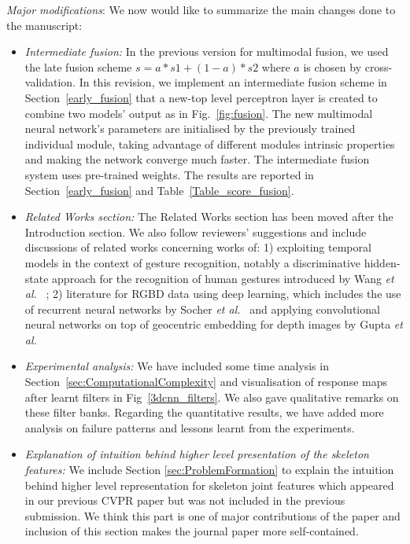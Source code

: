 \documentclass[12pt]{article}
\begin{document}
{\noindent \em Major modifications}: We now would like to summarize the main changes done to the manuscript:

\begin{itemize}
\item {\em Intermediate fusion:} In the previous version for multimodal fusion, we used the late fusion scheme  $s = a * s1 + (1-a)*s2$ where $a$ is chosen by cross-validation. In this revision, we implement an intermediate fusion scheme in Section~\ref{early_fusion} that a new-top level perceptron layer is created to combine two models' output as in Fig.~\ref{fig:fusion}. The new multimodal neural network's parameters are initialised by the previously trained individual module, taking advantage of different modules intrinsic properties and making the network converge much faster. The intermediate fusion system uses pre-trained weights. The results are reported in  Section~\ref{early_fusion} and Table~\ref{Table_score_fusion}.

\item {\em Related Works section:} The Related Works section has been moved after the Introduction section. We also follow reviewers' suggestions and include discussions of related works concerning works of: 1) exploiting temporal models in the context of gesture recognition, notably a discriminative hidden-state approach for the recognition of human gestures introduced by Wang \emph{et al.}~\cite{wang2006hidden} ; 2) literature for RGBD data using deep learning, which includes the use of recurrent neural networks by Socher \emph{et al.}~\cite{socher2012convolutional} and applying convolutional neural networks on top of geocentric embedding for depth images by Gupta \emph{et al.}~\cite{gupta2014learning}

\item {\em Experimental analysis:} We have included some time analysis in Section~\ref{sec:ComputationalComplexity} and visualisation of response maps after learnt filters in Fig~\ref{3dcnn_filters}. We also gave qualitative remarks on these filter banks. Regarding the quantitative results, we have added more analysis on failure patterns and lessons learnt from the experiments.

\item {\em Explanation of intuition behind higher level presentation of the skeleton features:} We include Section \ref{sec:ProblemFormation} to explain the intuition behind higher level representation  for skeleton joint features which appeared in our previous CVPR paper but was not included in the previous submission. We think this part is one of major contributions of the paper and inclusion of this section makes the journal paper more self-contained.
\end{itemize}
\end{document}
